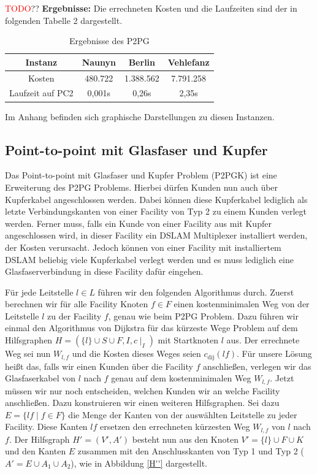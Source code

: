 \documentclass[11pt,a4paper]{article}
\newcommand{\TODO}{\textcolor{red}{TODO}}
\theoremstyle{my_th_style1}
\begin{document}
\TODO??
\textbf{Ergebnisse:} Die errechneten Kosten und die Laufzeiten sind der in folgenden Tabelle 2 dargestellt.
\begin{table}[h]
	\centering
	\begin{tabular}{c|c|c|c}
		 Instanz & Naunyn & Berlin & Vehlefanz \\	
		\hline
		Kosten & 480.722 & 1.388.562 & 7.791.258 \\
		Laufzeit auf PC2 & 0,001s & 0,26s & 2,35s\\
	\end{tabular}
	\label{P2PG}
	\caption{Ergebnisse des P2PG} 
\end{table}
Im Anhang befinden sich graphische Darstellungen zu diesen Instanzen.



\subsection{Point-to-point mit Glasfaser und Kupfer}
Das Point-to-point mit Glasfaser und Kupfer Problem (P2PGK) ist eine Erweiterung des P2PG Problems.
Hierbei d\"urfen Kunden nun auch \"uber Kupferkabel angeschlossen werden.
Dabei k\"onnen diese Kupferkabel lediglich als letzte Verbindungskanten von einer Facility von Typ 2 zu einem Kunden verlegt werden.
Ferner muss, falls ein Kunde von einer Facility aus mit Kupfer angeschlossen wird, in dieser Facility ein DSLAM Multiplexer installiert werden, der Kosten verursacht.
Jedoch k\"onnen von einer Facility mit installiertem DSLAM beliebig viele Kupferkabel verlegt werden und es muss lediglich eine Glasfaserverbindung in diese Facility daf\"ur eingehen.

Für jede Leitstelle $l \in L$ führen wir den folgenden Algorithmus durch.
Zuerst berechnen wir für alle Facility Knoten $f \in F$ einen kostenminimalen Weg von der Leitstelle $l$ zu der Facility $f$, genau wie beim P2PG Problem. Dazu führen wir einmal den Algorithmus von Dijkstra für das kürzeste Wege Problem auf dem Hilfsgraphen $H=(\{l\} \cup S \cup F , I,c\mid_I)$ mit Startknoten $l$ aus. Der errechnete Weg sei nun $W_{l,f}$ und die Kosten dieses Weges seien $c_{\text{dij}}(lf)$.
Für unsere Lösung heißt das, falls wir einen Kunden über die Facility $f$ anschließen, verlegen wir das Glasfaserkabel von $l$ nach $f$ genau auf dem kostenminimalen Weg $W_{l,f}$.  Jetzt müssen wir nur noch entscheiden, welchen Kunden wir an welche Facility anschließen.
Dazu konstruieren wir einen weiteren Hilfsgraphen. Sei dazu $E=\{lf \mid f \in F  \}$ die Menge der Kanten von der auswählten Leitstelle zu jeder Facility. Diese Kanten $lf$ ersetzen den errechneten kürzesten Weg $W_{l,f}$ von $l$ nach $f$. Der Hilfsgraph $H'=(V',A')$ besteht nun aus den Knoten $V'=\{l\} \cup F \cup K$ und den Kanten $E$ zusammen mit den Anschlusskanten von Typ 1 und Typ 2 ($A'=E \cup A_1 \cup A_2$), wie in Abbildung \ref{H''} dargestellt.
\end{document}
